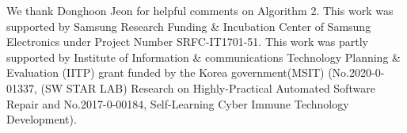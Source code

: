 \documentclass[acmsmall,10pt]{acmart}\settopmatter{printfolios=true}
\begin{document}




%
%
%
%





%


%
%
%
%

%


%

\begin{acks}
We thank Donghoon Jeon for helpful comments on Algorithm 2.
This work was supported by 
Samsung Research Funding \& Incubation Center of Samsung Electronics under Project Number SRFC-IT1701-51. 
This work was partly supported by 
Institute of Information \& communications Technology Planning \& Evaluation (IITP) grant funded by the Korea government(MSIT) (No.2020-0-01337, (SW STAR LAB) Research on Highly-Practical Automated Software Repair and 
No.2017-0-00184, Self-Learning Cyber Immune Technology Development). 




\end{acks}




\appendix



\end{document}
